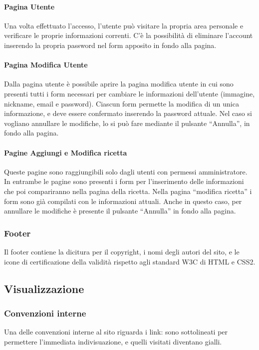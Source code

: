 \paragraph{Pagina Utente}
Una volta effettuato l'accesso, l'utente può visitare la propria area personale e verificare le proprie informazioni correnti. C'è la possibilità di eliminare l'account inserendo la propria password nel form apposito in fondo alla pagina.

\paragraph{Pagina Modifica Utente}
Dalla pagina utente è possibile aprire la pagina modifica utente in cui sono presenti tutti i form necessari per cambiare le informazioni dell'utente (immagine, nickname, email e password). Ciascun form permette la modifica di un unica informazione, e deve essere confermato inserendo la password attuale. Nel caso si vogliano annullare le modifiche, lo si può fare mediante il pulsante ``Annulla'', in fondo alla pagina.

\paragraph{Pagine Aggiungi e Modifica ricetta}
Queste pagine sono raggiungibili solo dagli utenti con permessi amministratore. In entrambe le pagine sono presenti i form per l'inserimento delle informazioni che poi compariranno nella pagina della ricetta. Nella pagina ``modifica ricetta'' i form sono già compilati con le informazioni attuali. Anche in questo caso, per annullare le modifiche è presente il pulsante ``Annulla'' in fondo alla pagina.

\subsubsection{Footer}
\label{ssub:footer}
Il footer contiene la dicitura per il copyright, i nomi degli autori del sito, e le icone di certificazione della validità rispetto agli standard W3C di HTML e CSS2.

\subsection{Visualizzazione} %
\label{sub:visualizzazione}
\subsubsection{Convenzioni interne}
\label{ssub:convenzioni_interne}
Una delle convenzioni interne al sito riguarda i link: sono sottolineati per permettere l'immediata indivisuazione, e quelli visitati diventano gialli.
